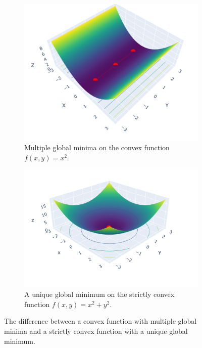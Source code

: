 \begin{figure}[h]
    \begin{subfigure}[b]{0.48\linewidth}
        \centering
        \includegraphics[width=0.8\linewidth]{figures/2background/convex_func.png}
        \caption{Multiple global minima on the convex function
        $f(x,y) = x^2$.}
        \label{fig:convex_func}
    \end{subfigure}
    \hfill
    \begin{subfigure}[b]{0.48\linewidth}
        \centering
        \includegraphics[width=\linewidth]{figures/2background/strict_convex.png}
        \caption{A unique global minimum on the strictly convex function
        $f(x,y) = x^2 + y^2$.}
        \label{fig:strict_convex_func}
    \end{subfigure}
    \caption{The difference between a convex function with multiple global minima and a strictly convex function with a unique global minimum.}
    \label{fig:diff_convex_functions}
\end{figure}


